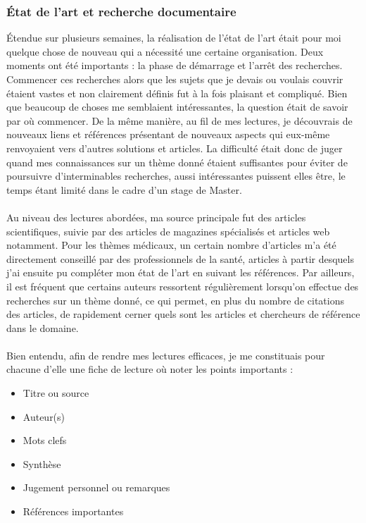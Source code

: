 	\subsubsection{État de l'art et recherche documentaire}
Étendue sur plusieurs semaines, la réalisation de l'état de l'art était pour moi quelque chose de nouveau qui a nécessité une certaine organisation. Deux moments ont été importants : la phase de démarrage et l'arrêt des recherches. Commencer ces recherches alors que les sujets que je devais ou voulais couvrir étaient vastes et non clairement définis fut à la fois plaisant et compliqué. Bien que beaucoup de choses me semblaient intéressantes, la question était de savoir par où commencer. De la même manière, au fil de mes lectures, je découvrais de nouveaux liens et références présentant de nouveaux aspects qui eux-même renvoyaient vers d'autres solutions et articles. La difficulté était donc de juger quand mes connaissances sur un thème donné étaient suffisantes pour éviter de poursuivre d'interminables recherches, aussi intéressantes puissent elles être, le temps étant limité dans le cadre d'un stage de Master.
	\paragraph{}Au niveau des lectures abordées, ma source principale fut des articles scientifiques, suivie par des articles de magazines spécialisés et articles web notamment. Pour les thèmes médicaux, un certain nombre d'articles m'a été directement conseillé par des professionnels de la santé, articles à partir desquels j'ai ensuite pu compléter mon état de l'art en suivant les références. Par ailleurs, il est fréquent que certains auteurs ressortent régulièrement lorsqu'on effectue des recherches sur un thème donné, ce qui permet, en plus du nombre de citations des articles, de rapidement cerner quels sont les articles et chercheurs de référence dans le domaine.
	\paragraph{}Bien entendu, afin de rendre mes lectures efficaces, je me constituais pour chacune d'elle une fiche de lecture où noter les points importants : 
\begin{itemize}
	\item Titre ou source
	\item Auteur(s)
	\item Mots clefs
	\item Synthèse
	\item Jugement personnel ou remarques
	\item Références importantes
\end{itemize}
